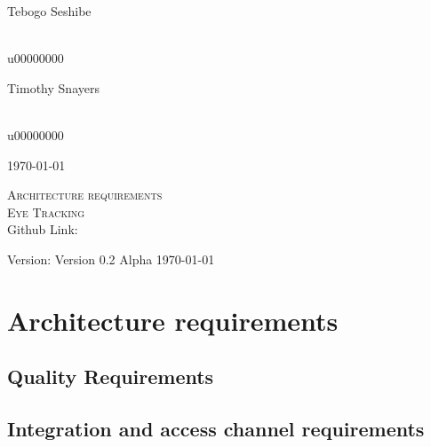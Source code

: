 \documentclass[a4paper,12pt]{report}
\begin{document}
\begin{titlepage}
\begin{center}
\begin{minipage}{0.4\textwidth}
\end{minipage}
\begin{minipage}{0.4\textwidth}
\begin{flushleft} \large
Tebogo {Seshibe}
\end{flushleft}
\end{minipage}
\begin{minipage}{0.4\textwidth}
\begin{flushright} \large
\emph{} \\
u00000000
\end{flushright}
\end{minipage}
\begin{minipage}{0.4\textwidth}
\begin{flushleft} \large
Timothy {Snayers}
\end{flushleft}
\end{minipage}
\begin{minipage}{0.4\textwidth}
\begin{flushright} \large
\emph{} \\
u00000000
\end{flushright}
\end{minipage}
\vfill
{\large \today}
\end{center}
\end{titlepage}
\footnotesize
%
\normalsize

\renewcommand{\thesection}{\arabic{section}}
\newpage
\begin{center}
\textsc{\LARGE Architecture requirements}\\[1.5cm]
\textsc{\Large Eye Tracking}\\[0.5cm]

Github Link:

Version: Version 0.2 Alpha 
\today
\end{center}
\tableofcontents{}


\section{Architecture requirements}

\subsection{Quality Requirements}
	
\subsection{Integration and access channel requirements}
	
\end{document}
